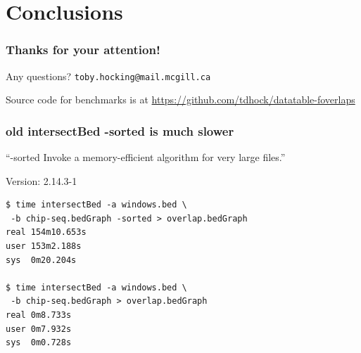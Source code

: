 \documentclass{beamer}
\begin{document}
\section{Conclusions}

\begin{frame}
  \frametitle{Thanks for your attention!}
  Any questions? \texttt{toby.hocking@mail.mcgill.ca}

  \vskip 1cm

  Source code for benchmarks is at
  \url{https://github.com/tdhock/datatable-foverlaps}
\end{frame}

\begin{frame}[fragile]
  \frametitle{old intersectBed -sorted is much slower}

  ``-sorted Invoke a memory-efficient algorithm for very large files.''

Version: 2.14.3-1


\begin{verbatim}
$ time intersectBed -a windows.bed \
 -b chip-seq.bedGraph -sorted > overlap.bedGraph
real 154m10.653s
user 153m2.188s
sys  0m20.204s

$ time intersectBed -a windows.bed \
 -b chip-seq.bedGraph > overlap.bedGraph
real 0m8.733s
user 0m7.932s
sys  0m0.728s
\end{verbatim}


  
\end{frame}
\end{document}
